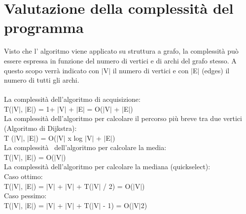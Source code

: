 \documentclass[11pt, a4paper, titlepage, block]{article}
\begin{document}
	\newpage
\section{Valutazione della complessit\`{a} del programma}
	Visto che l' algoritmo viene applicato su struttura a grafo, la complessit\`{a} pu\`{o} essere espressa in 
	funzione del numero di vertici e di archi del grafo stesso. A questo scopo verr\`{a} indicato con $|$V$|$ il 
	numero di vertici e con $|$E$|$ (edges) il numero di tutti gli archi.\\
	\\
	La complessit\`{a} dell'algoritmo di acquisizione:\\
	\indent T($|$V$|$, $|$E$|$) = 1+ $|$V$|$ + $|$E$|$ = O($|$V$|$ + $|$E$|$)\\
	La complessit\`{a} dell'algoritmo per calcolare il percorso pi\`{u} breve tra due vertici (Algoritmo di Dijkstra):\\
	\indent T ($|$V$|$, $|$E$|$) = O($|$V$|$ x log $|$V$|$ + $|$E$|$)\\
	La complessit\`{a}  dell'algoritmo per calcolare la media:\\
	\indent T($|$V$|$, $|$E$|$) = O($|$V$|$)\\
	La complessit\`{a} dell'algoritmo per calcolare la mediana (quickselect):\\
	\indent Caso ottimo:\\
	\indent \indent T($|$V$|$, $|$E$|$) = $|$V$|$ + $|$V$|$ + T($|$V$|$ / 2) = O($|$V$|$)\\
	\indent Caso pessimo:\\
	\indent \indent T($|$V$|$, $|$E$|$) = $|$V$|$ + $|$V$|$ + T($|$V$|$ - 1) = O($|$V$|$2)\\
	\newpage
\end{document}
